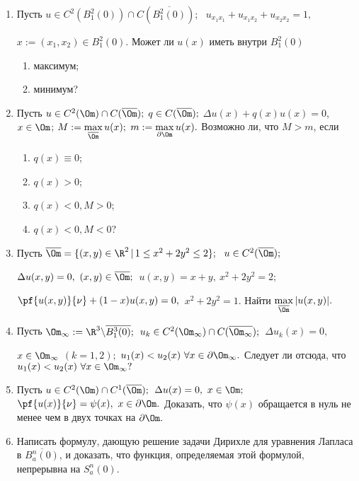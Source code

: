 \documentclass[a4paper]{article}
\def\D{\Delta}
\begin{document}
\begin{enumerate}
\item
Пусть $u\in C^2(B_1^2(0))\cap C(\overline{B_1^2(0)})$; \
$u_{x_1x_1}+u_{x_1x_2}+u_{x_2x_2}=1,$

\noindent
$x:=(x_1,x_2)\in B_1^2(0).$
Может ли $u(x)$ иметь внутри $B_1^2(0)$
\begin{enumerate}
  \item
  максимум;
  \item
  минимум?
\end{enumerate}

\item
Пусть $u\in C^2(\Om)\cap C(\overline{\Om});$ $q\in C(\overline \Om);$ $\D u(x) +
q(x) u(x) =0$,\ $x\in\Om$; $M:=\max\limits_{\overline \Om} u(x);$
$m:=\max\limits_{\partial \Om} u(x).$ Возможно ли, что $M>m$, если
\begin{enumerate}
  \item
  $q(x)\equiv 0$;
  \item
  $q(x) > 0$;
  \item
  $q(x) < 0, M > 0$;
  \item
  $q(x) < 0, M < 0$?
\end{enumerate}

\item
Пусть $\overline{\Om}=\{(x,y)\in \R^2\, |\, 1\le x^2+2y^2\le 2\};\ $
$u\in C^2(\overline{\Om});$

\noindent
$\D u(x,y)=0,\ (x,y)\in \overline{\Om};$\
$u(x,y)=x+y,\ x^2+2y^2=2;$

\noindent
$\pf{u(x,y)}{\nu}+(1-x) u(x,y)=0,$\
$x^2+2y^2=1.$ Найти $\max\limits_{\overline{\Om}} |u(x,y)|.$

\item
Пусть $\Om_\infty:=\R^3\backslash\overline{B_1^3(0)};$\
$u_k\in C^2(\Om_\infty)\cap C(\overline{\Om_\infty});$\
$\D u_k(x)=0,$

\noindent
$x\in\Om_\infty$ $(k=1,2);$ $u_1(x)<u_2(x)\
\forall x\in\partial \Om_\infty.$ Следует ли отсюда, что $u_1(x)<u_2(x)\
\forall x\in\Om_\infty?$

\item
Пусть $u\in C^2(\Om)\cap C^1(\overline{\Om});$\ $\D u(x)=0,\ x\in\Om;$\
$\pf{u(x)}{\nu}=\psi(x),\ x\in\partial\Om.$ Доказать, что $\psi(x)$
обращается в нуль не менее чем в двух точках на $\partial\Om.$

\item
Написать формулу, дающую решение задачи Дирихле для уравнения Лапласа в
$\overline{B_a^n(0)}$, и доказать, что функция, определяемая этой формулой,
непрерывна на $S_a^n(0).$


\end{enumerate}
\end{document}
